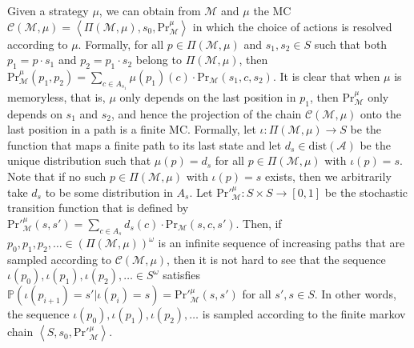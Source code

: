 \documentclass[10pt,a4paper]{amsart}
\theoremstyle{definition}
\numberwithin{equation}{section}
\newcommand{\A}{{\mathcal A}}
\newcommand{\C}{{\mathcal C}}
\newcommand{\M}{{\mathcal M}}
\newcommand{\zug}[1]{\left\langle #1 \right\rangle}
\renewcommand{\P}{\mathbb{P}}
\renewcommand{\Pr}{\mathrm{Pr}}
\newcommand{\dist}{\mathrm{dist}}
\begin{document}
Given a strategy $\mu$, we can obtain from $\M$ and $\mu$ the MC $\C(\M,\mu) = \zug{\Pi(\M,\mu),s_0,\Pr_\M^\mu}$ in which the choice of actions is resolved according to $\mu$. Formally, for all $p\in \Pi(\M,\mu)$ and $s_1,s_2\in S$ such that both $p_1=p\cdot s_1$ and $p_2=p_1\cdot s_2$ belong to $\Pi(\M,\mu)$, then $\Pr_\M^\mu(p_1,p_2) = \sum_{c\in A_{s_1}}\mu(p_1)(c)\cdot \Pr_\M(s_1,c,s_2)$. 
It is clear that when $\mu$ is memoryless, that is, $\mu$ only depends on the last position in $p_1$, then ${\Pr}_\M^\mu$ only depends on $s_1$ and $s_2$, and hence the projection of the chain $\C(\M,\mu)$ onto the last position in a path is a finite MC. Formally, let $\iota:\Pi(\M,\mu)\rightarrow S$ be the function that maps a finite path to its last state and let $d_s\in \dist(\A)$ be the unique distribution such that $\mu(p)=d_s$ for all $p\in \Pi(\M,\mu)$ with $\iota(p)=s$. Note that if no such $p\in \Pi(\M,\mu)$ with $\iota(p)=s$ exists, then we arbitrarily take $d_s$ to be some distribution in $A_s$. 
Let ${\Pr'}_{\M}^\mu:S\times S\rightarrow [0,1]$ be the stochastic transition function that is defined by ${\Pr'}_\M^\mu(s,s')=\sum_{c\in A_{s}}d_s(c)\cdot \Pr_\M(s,c,s')$. Then, if $p_0,p_1,p_2,\ldots \in (\Pi(\M,\mu))^\omega$ is an infinite sequence of increasing paths that are sampled according to $\C(\M,\mu)$, then it is not hard to see that the sequence $\iota(p_0),\iota(p_1),\iota(p_2),\ldots \in S^\omega$ satisfies $\P(\iota(p_{i+1})=s'|\iota(p_i)=s)={\Pr'}_\M^\mu(s,s')$ for all $s',s\in S$. In other words, the sequence $\iota(p_0),\iota(p_1),\iota(p_2),\ldots$ is sampled according to the finite markov chain $\zug{S,s_0,{\Pr'}_\M^\mu}$.
\end{document}
